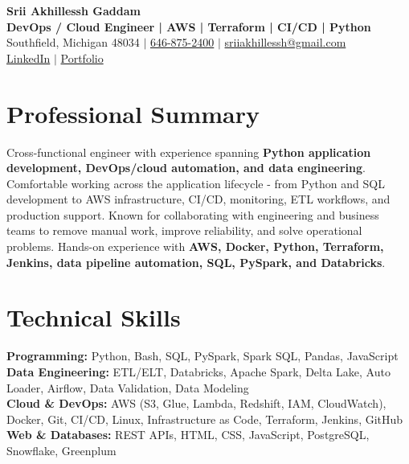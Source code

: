 \documentclass[letterpaper,10pt]{article}
\begin{document}
\fontsize{9.35pt}{10.45pt}\selectfont

\begin{center}
    {\LARGE \textbf{Srii Akhillessh Gaddam}} \\[-1pt]
    \textbf{DevOps / Cloud Engineer | AWS | Terraform | CI/CD | Python} \\[2pt]
    Southfield, Michigan 48034 $|$
    \href{tel:6468752400}{646-875-2400} $|$
    \href{mailto:sriiakhillessh@gmail.com}{sriiakhillessh@gmail.com} \\[1pt]
    \href{https://www.linkedin.com/in/srii-akhiilessh-gaddam-b48668191/}{LinkedIn} $|$
    \href{https://sriiakhillesshg.github.io/portfolio/}{Portfolio}
\end{center}
\vspace{-8pt}

\section{Professional Summary}
\small{Cross-functional engineer with experience spanning \textbf{Python application development, DevOps/cloud automation, and data engineering}. Comfortable working across the application lifecycle - from Python and SQL development to AWS infrastructure, CI/CD, monitoring, ETL workflows, and production support. Known for collaborating with engineering and business teams to remove manual work, improve reliability, and solve operational problems. Hands-on experience with \textbf{AWS, Docker, Python, Terraform, Jenkins, data pipeline automation, SQL, PySpark, and Databricks}.}

\section{Technical Skills}
\small{
\textbf{Programming:} Python, Bash, SQL, PySpark, Spark SQL, Pandas, JavaScript \\
\textbf{Data Engineering:} ETL/ELT, Databricks, Apache Spark, Delta Lake, Auto Loader, Airflow, Data Validation, Data Modeling \\
\textbf{Cloud \& DevOps:} AWS (S3, Glue, Lambda, Redshift, IAM, CloudWatch), Docker, Git, CI/CD, Linux, Infrastructure as Code, Terraform, Jenkins, GitHub \\
\textbf{Web \& Databases:} REST APIs, HTML, CSS, JavaScript, PostgreSQL, Snowflake, Greenplum
}
\end{document}
